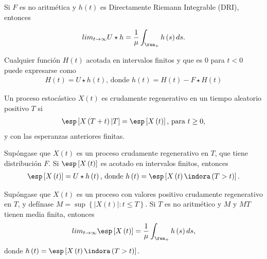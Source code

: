 \begin{Teo}
Si $F$ es no aritm\'etica y $h\left(t\right)$ es Directamente Riemann Integrable (DRI), entonces

\begin{eqnarray*}
lim_{t\rightarrow\infty}U\star h=\frac{1}{\mu}\int_{\rea_{+}}h\left(s\right)ds.
\end{eqnarray*}
\end{Teo}

\begin{Prop}
Cualquier funci\'on $H\left(t\right)$ acotada en intervalos finitos y que es 0 para $t<0$ puede expresarse como
\begin{eqnarray*}
H\left(t\right)=U\star h\left(t\right)\textrm{,  donde }h\left(t\right)=H\left(t\right)-F\star H\left(t\right)
\end{eqnarray*}
\end{Prop}

\begin{Def}
Un proceso estoc\'astico $X\left(t\right)$ es crudamente regenerativo en un tiempo aleatorio positivo $T$ si
\begin{eqnarray*}
\esp\left[X\left(T+t\right)|T\right]=\esp\left[X\left(t\right)\right]\textrm{, para }t\geq0,\end{eqnarray*}
y con las esperanzas anteriores finitas.
\end{Def}

\begin{Prop}
Sup\'ongase que $X\left(t\right)$ es un proceso crudamente regenerativo en $T$, que tiene distribuci\'on $F$. Si $\esp\left[X\left(t\right)\right]$ es acotado en intervalos finitos, entonces
\begin{eqnarray*}
\esp\left[X\left(t\right)\right]=U\star h\left(t\right)\textrm{,  donde }h\left(t\right)=\esp\left[X\left(t\right)\indora\left(T>t\right)\right].
\end{eqnarray*}
\end{Prop}

\begin{Teo}
Sup\'ongase que $X\left(t\right)$ es un proceso con valores positivo crudamente regenerativo en $T$, y def\'inase $M=\sup\left\{|X\left(t\right)|:t\leq T\right\}$. Si $T$ es no aritm\'etico y $M$ y $MT$ tienen media finita, entonces
\begin{eqnarray*}
lim_{t\rightarrow\infty}\esp\left[X\left(t\right)\right]=\frac{1}{\mu}\int_{\rea_{+}}h\left(s\right)ds,
\end{eqnarray*}
donde $h\left(t\right)=\esp\left[X\left(t\right)\indora\left(T>t\right)\right]$.
\end{Teo}

